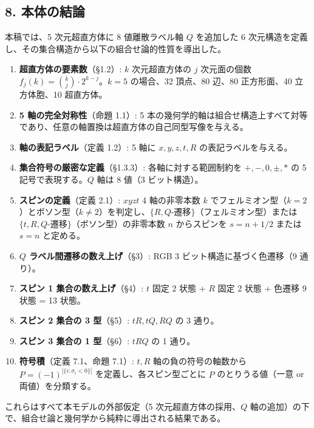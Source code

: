 \documentclass[
  a4paper,11pt]{ltjsarticle}
\providecommand{\tightlist}{%
  \setlength{\itemsep}{0pt}\setlength{\parskip}{0pt}}
\theoremstyle{definition}
\theoremstyle{remark}
\begin{document}
\subsection{8. 本体の結論}\label{ux672cux4f53ux306eux7d50ux8ad6}

本稿では、5 次元超直方体に 8 値離散ラベル軸 \(Q\) を追加した 6
次元構造を定義し、その集合構造から以下の組合せ論的性質を導出した。

\begin{enumerate}
\def\labelenumi{\arabic{enumi}.}
\tightlist
\item
  \textbf{超直方体の要素数}（§1.2）: \(k\) 次元超直方体の \(j\)
  次元面の個数 \(f_j(k) = \binom{k}{j} \cdot 2^{k-j}\)。\(k = 5\)
  の場合、32 頂点、80 辺、80 正方形面、40 立方体胞、10 超直方体。
\item
  \textbf{5 軸の完全対称性}（命題 1.1）: 5
  本の幾何学的軸は組合せ構造上すべて対等であり、任意の軸置換は超直方体の自己同型写像を与える。
\item
  \textbf{軸の表記ラベル}（定義 1.2）: 5 軸に \(x, y, z, t, R\)
  の表記ラベルを与える。
\item
  \textbf{集合符号の厳密な定義}（§1.3.3）: 各軸に対する範囲制約を
  \(+, -, 0, \pm, *\) の 5 記号で表現する。\(Q\) 軸は 8 値（3
  ビット構造）。
\item
  \textbf{スピンの定義}（定義 2.1）: \(xyzt\) 4 軸の非零本数 \(k\)
  でフェルミオン型（\(k = 2\)）とボソン型（\(k \neq 2\)）を判定し、\(\{R, Q\text{-遷移}\}\)（フェルミオン型）または
  \(\{t, R, Q\text{-遷移}\}\)（ボソン型）の非零本数 \(n\) からスピンを
  \(s = n + 1/2\) または \(s = n\) と定める。
\item
  \textbf{\(Q\) ラベル間遷移の数え上げ}（§3）: RGB 3
  ビット構造に基づく色遷移（9 通り）。
\item
  \textbf{スピン 1 集合の数え上げ}（§4）: \(t\) 固定 2 状態 + \(R\) 固定
  2 状態 + 色遷移 9 状態 = 13 状態。
\item
  \textbf{スピン 2 集合の 3 型}（§5）: \(tR, tQ, RQ\) の 3 通り。
\item
  \textbf{スピン 3 集合の 1 型}（§6）: \(tRQ\) の 1 通り。
\item
  \textbf{符号積}（定義 7.1、命題 7.1）: \(t, R\) 軸の負の符号の軸数から
  \(P = (-1)^{|\{i : \sigma_i < 0\}|}\) を定義し、各スピン型ごとに \(P\)
  のとりうる値（一意 or 両値）を分類する。
\end{enumerate}

これらはすべて本モデルの外部仮定（5 次元超直方体の採用、\(Q\)
軸の追加）の下で、組合せ論と幾何学から純粋に導出される結果である。
\end{document}
